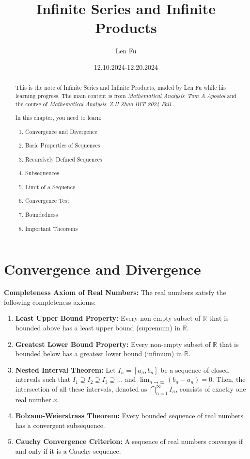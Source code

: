 \documentclass{article}
\title{Infinite Series and Infinite Products}
\author{Len Fu}
\date{12.10.2024-12.20.2024}
\theoremstyle{definition}
\begin{document}
\maketitle

\begin{abstract}
This is the note of Infinite Series and Infinite Products,
 maded by Len Fu while his learning progress.
 The main content is from \textit{Mathematical Analysis\ Tom A.Apostol} and the course of \textit{Mathematical Analysis\ Z.H.Zhao BIT 2024 Fall}.

In this chapter,  you need to learn:
\begin{enumerate}
    \item Convergence and Divergence
    \item Basic Properties of Sequences
    \item Recursively Defined Sequences
    \item Subsequences
    \item Limit of a Sequence
    \item Convergence Test
    \item Boundedness
    \item Important Theorems
\end{enumerate}
\end{abstract}
\newpage

\renewcommand{\contentsname}{Contents}
\tableofcontents
\newpage



\section{Convergence and Divergence}

\textbf{Completeness Axiom of Real Numbers:} The real numbers satisfy the following completeness axioms:

\begin{enumerate}
    \item \textbf{Least Upper Bound Property:} Every non-empty subset of \(\mathbb{R}\) that is bounded above has a least upper bound (supremum) in \(\mathbb{R}\).
    \item \textbf{Greatest Lower Bound Property:} Every non-empty subset of \(\mathbb{R}\) that is bounded below has a greatest lower bound (infimum) in \(\mathbb{R}\).
    \item \textbf{Nested Interval Theorem:} Let \(I_n = [a_n, b_n]\) be a sequence of closed intervals such that \(I_1 \supseteq I_2 \supseteq I_3 \supseteq \ldots\) and \(\lim_{n \to \infty} (b_n - a_n) = 0\). Then, the intersection of all these intervals, denoted as \(\bigcap_{n=1}^{\infty} I_n\), consists of exactly one real number \(x\).
    \item \textbf{Bolzano-Weierstrass Theorem:} Every bounded sequence of real numbers has a convergent subsequence.
    \item \textbf{Cauchy Convergence Criterion:} A sequence of real numbers converges if and only if it is a Cauchy sequence.
\end{enumerate}
\end{document}
